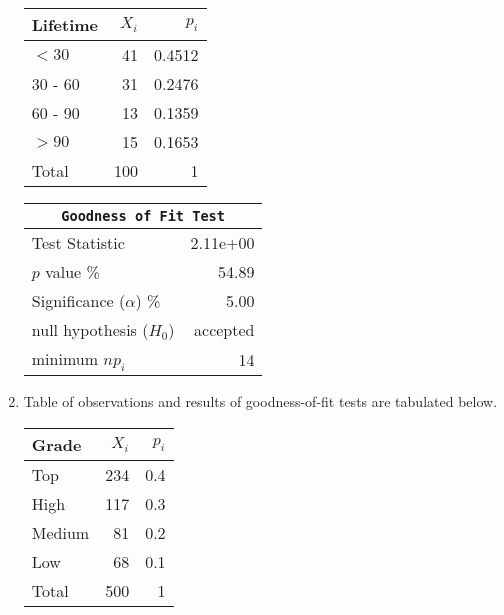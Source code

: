 \begin{enumerate}
	\begin{table}[H]
		\centering
		\begin{minipage}{0.4\textwidth}
			\centering
			\begin{tabular}{@{}lrr@{}}
				\toprule
				Lifetime & $X_i$ &   $p_i$ \\
				\midrule
				$ <30 $   &    41 &  0.4512 \\
				30 - 60 &    31 &  0.2476 \\
				60 - 90 &    13 &  0.1359 \\
				$ >90  $  &    15 &  0.1653 \\
				\midrule
				Total &   100 &       1 \\
				\bottomrule
			\end{tabular}
			
		\end{minipage}
		\begin{minipage}{0.4\textwidth}
			\centering
			\begin{tabular}{@{}lr@{}}
				\toprule
				\multicolumn{2}{c}{\texttt{Goodness of Fit Test}} \\
				\midrule
				Test Statistic             &  2.11e+00 \\
				$p$ value \%               &     54.89 \\
				Significance ($\alpha$) \% &      5.00 \\
				null hypothesis ($H_0$)    &  accepted \\
				minimum $n p_i$            &        14 \\
				\bottomrule
			\end{tabular}
			
		\end{minipage}
	\end{table}
	\bigskip
	
	\item Table of observations and results of goodness-of-fit tests are tabulated below.
	
	\begin{table}[H]
		\centering
		\begin{minipage}{0.4\textwidth}
			\centering
			\begin{tabular}{@{}lrr@{}}
				\toprule
				Grade & $X_i$ & $p_i$ \\
				\midrule
				Top    &   234 &   0.4 \\
				High   &   117 &   0.3 \\
				Medium &    81 &   0.2 \\
				Low    &    68 &   0.1 \\
				\midrule
				Total  &   500 &     1 \\
				\bottomrule
			\end{tabular}
			

\end{minipage}
\end{table}
\end{enumerate}

